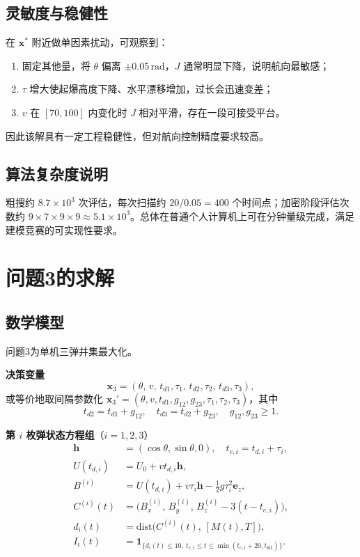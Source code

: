 \documentclass[withoutpreface,bwprint]{cumcmthesis}
\begin{document}
\subsection{灵敏度与稳健性}
在 $\mathbf{x}^\ast$ 附近做单因素扰动，可观察到：
\begin{enumerate}
  \item 固定其他量，将 $\theta$ 偏离 $\pm 0.05\,\mathrm{rad}$，$J$ 通常明显下降，说明航向最敏感；
  \item $\tau$ 增大使起爆高度下降、水平漂移增加，过长会迅速变差；
  \item $v$ 在 $[70,100]$ 内变化时 $J$ 相对平滑，存在一段可接受平台。
\end{enumerate}
因此该解具有一定工程稳健性，但对航向控制精度要求较高。

\subsection{算法复杂度说明}
粗搜约 $8.7\times 10^3$ 次评估，每次扫描约 $20/0.05=400$ 个时间点；加密阶段评估次数约 $9\times 7\times 9\times 9\approx 5.1\times 10^3$。总体在普通个人计算机上可在分钟量级完成，满足建模竞赛的可实现性要求。

\section{问题3的求解}
\label{sec:q3}

\subsection{数学模型}
问题3为单机三弹并集最大化。

\textbf{决策变量}
\begin{equation}
\mathbf{x}_3=(\theta,\,v,\,t_{d1},\tau_1,\,t_{d2},\tau_2,\,t_{d3},\tau_3),
\label{eq:q3-var}
\end{equation}
或等价地取间隔参数化 $\mathbf{x}_3'=(\theta,v,t_{d1},g_{12},g_{23},\tau_1,\tau_2,\tau_3)$，其中
\begin{equation}
t_{d2}=t_{d1}+g_{12},\quad t_{d3}=t_{d2}+g_{23},\quad g_{12},g_{23}\ge 1.
\label{eq:q3-gap}
\end{equation}

\textbf{第 $i$ 枚弹状态方程组}（$i=1,2,3$）
\begin{equation}
\begin{aligned}
\mathbf{h}&=(\cos\theta,\sin\theta,0),\quad
t_{e,i}=t_{d,i}+\tau_i,\\
U(t_{d,i})&=U_0+v t_{d,i}\mathbf{h},\\
B^{(i)}&=U(t_{d,i})+v\tau_i\mathbf{h}-\tfrac12 g\tau_i^2\mathbf{e}_z,\\
C^{(i)}(t)&=\big(B^{(i)}_x,\,B^{(i)}_y,\,B^{(i)}_z-3(t-t_{e,i})\big),\\
d_i(t)&=\mathrm{dist}\big(C^{(i)}(t),\,[M(t),T]\big),\\
I_i(t)&=\mathbf{1}_{\{
d_i(t)\le 10,\ 
t_{e,i}\le t\le\min(t_{e,i}+20,t_{\mathrm{hit}})
\}}.
\end{aligned}
\label{eq:q3-state}
\end{equation}
\end{document}
